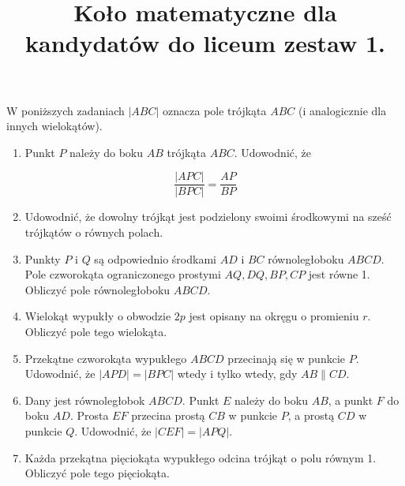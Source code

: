 \documentclass[10pt]{article}
\title{Koło matematyczne dla kandydatów do liceum zestaw 1. }
\author{}
\date{}
\begin{document}
\maketitle
W poniższych zadaniach \(|A B C|\) oznacza pole trójkąta \(A B C\) (i analogicznie dla innych wielokątów).

\begin{enumerate}
  \item Punkt \(P\) należy do boku \(A B\) trójkąta \(A B C\). Udowodnić, że
\end{enumerate}

\[
\frac{|A P C|}{|B P C|}=\frac{A P}{B P}
\]

\begin{enumerate}
  \setcounter{enumi}{1}
  \item Udowodnić, że dowolny trójkąt jest podzielony swoimi środkowymi na sześć trójkątów o równych polach.
  \item Punkty \(P\) i \(Q\) są odpowiednio środkami \(A D\) i \(B C\) równoległoboku \(A B C D\). Pole czworokąta ograniczonego prostymi \(A Q, D Q, B P, C P\) jest równe 1. Obliczyć pole równoległoboku \(A B C D\).
  \item Wielokąt wypukły o obwodzie \(2 p\) jest opisany na okręgu o promieniu \(r\). Obliczyć pole tego wielokąta.
  \item Przekątne czworokąta wypukłego \(A B C D\) przecinają się w punkcie \(P\). Udowodnić, że \(|A P D|=|B P C|\) wtedy i tylko wtedy, gdy \(A B \| C D\).
  \item Dany jest równoległobok \(A B C D\). Punkt \(E\) należy do boku \(A B\), a punkt \(F\) do boku \(A D\). Prosta \(E F\) przecina prostą \(C B\) w punkcie \(P\), a prostą \(C D\) w punkcie \(Q\). Udowodnić, że \(|C E F|=|A P Q|\).
  \item Każda przekątna pięciokąta wypukłego odcina trójkąt o polu równym 1. Obliczyć pole tego pięciokąta.
\end{enumerate}
\end{document}
